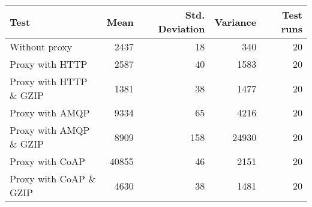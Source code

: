 \begin{tabular}{lrrrr}
\hline
 Test                   &   Mean &   Std. Deviation &   Variance &   Test runs \\
\hline
 Without proxy          &   2437 &               18 &        340 &          20 \\
 Proxy with HTTP        &   2587 &               40 &       1583 &          20 \\
 Proxy with HTTP \& GZIP &   1381 &               38 &       1477 &          20 \\
 Proxy with AMQP        &   9334 &               65 &       4216 &          20 \\
 Proxy with AMQP \& GZIP &   8909 &              158 &      24930 &          20 \\
 Proxy with CoAP        &  40855 &               46 &       2151 &          20 \\
 Proxy with CoAP \& GZIP &   4630 &               38 &       1481 &          20 \\
\hline
\end{tabular}